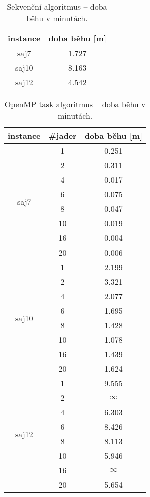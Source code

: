 \documentclass{article}
\begin{document}
    \begin{table}[hb!]
        \centering
        \begin{tabular}{|c|c|}
            \hline
            \multicolumn{1}{|l|}{\textbf{instance}} & \multicolumn{1}{l|}{\textbf{{}doba běhu} {[}m{]}} \\ \hline
            saj7                           & 1.727                                       \\ \hline
            saj10                          & 8.163                                       \\ \hline
            saj12                          & 4.542                                       \\ \hline
        \end{tabular}
        \caption{Sekvenční algoritmus -- doba běhu v minutách.}
        \label{tab:seq}
    \end{table}

    \begin{table}[h]
        \centering
        \begin{tabular}{|c|c|c|}
            \hline
            \multicolumn{1}{|l|}{\textbf{instance}} & \multicolumn{1}{l|}{\textbf{\#jader}} & \textbf{doba běhu} {[}m{]} \\ \hline
            \multirow{8}{*}{saj7}  & 1  & 0.251 \\
            & 2  & 0.311 \\
            & 4  & 0.017 \\
            & 6  & 0.075 \\
            & 8  & 0.047 \\
            & 10 & 0.019 \\
            & 16 & 0.004 \\
            & 20 & 0.006 \\ \hline
            \multirow{8}{*}{saj10} & 1  & 2.199 \\
            & 2  & 3.321 \\
            & 4  & 2.077 \\
            & 6  & 1.695 \\
            & 8  & 1.428 \\
            & 10 & 1.078 \\
            & 16 & 1.439 \\
            & 20 & 1.624 \\ \hline
            \multirow{8}{*}{saj12} & 1  & 9.555 \\
            & 2  & $\infty$   \\
            & 4  & 6.303 \\
            & 6  & 8.426 \\
            & 8  & 8.113 \\
            & 10 & 5.946 \\
            & 16 & $\infty$   \\
            & 20 & 5.654 \\ \hline
        \end{tabular}
        \caption{OpenMP task algoritmus -- doba běhu v minutách.}
        \label{tab:openmp-task}
    \end{table}
\end{document}

